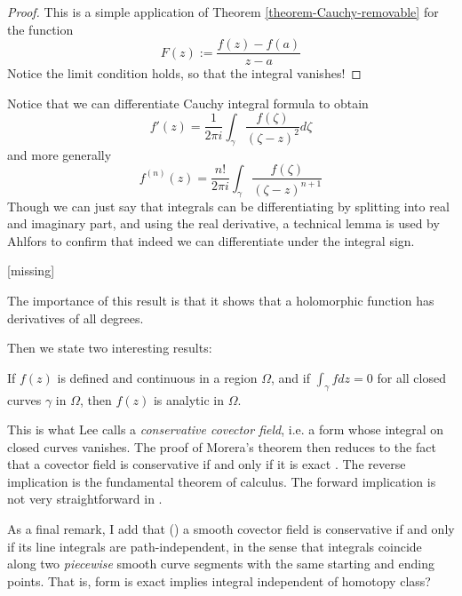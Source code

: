 \begin{proof}
This is a simple application of Theorem \ref{theorem-Cauchy-removable} for the
function
$$
F(z):=\frac{f(z)-f(a)}{z-a}
$$
Notice the limit condition holds, so that the integral vanishes!
\end{proof}

\noindent
Notice that we can differentiate Cauchy integral formula to obtain
\begin{equation}
\label{equation-first-derivative-Cauchy-formula}
f'(z)=\frac{1}{2\pi i}\int_\gamma\frac{f(\zeta)}{(\zeta-z)^2}d\zeta
\end{equation}
and more generally
$$
f^{(n)}(z)=\frac{n!}{2\pi i}\int_\gamma \frac{f(\zeta)}{(\zeta-z)^{n+1}}
$$
Though we can just say that integrals can be differentiating by splitting into
real and imaginary part, and using the real derivative, a technical lemma is 
used by Ahlfors to confirm that indeed we can differentiate
under the integral sign.

\begin{lemma}
\label{lemma-technical-lemma}
[missing]
\end{lemma}

\noindent
The importance of this result is that it shows that a holomorphic function has
derivatives of all degrees.

Then we state two interesting results:

\begin{theorem}[Morera]
\label{theorem-Morera}
\begin{reference}
\cite[p. 122]{ahl}
\end{reference}
If $f(z)$ is defined and continuous in a region $\Omega$, and if 
$\int_\gamma fdz=0$ for all closed curves $\gamma$ in $\Omega$, then $f(z)$ is
analytic in $\Omega$.
\end{theorem}

\noindent
This is what Lee calls a {\it conservative covector field}, i.e. a form whose
integral on closed curves vanishes. The proof of Morera's theorem then reduces
to the fact that a covector field is conservative if and only if it is exact
\cite[Theorem 11.42]{les}. The reverse implication is the fundamental theorem of
calculus. The forward implication is not very straightforward in \cite{les}.

As a final remark, I add that (\cite[Propoistion 11.40]{les}) a smooth covector
field is conservative if and only if its line integrals are path-independent, in
the sense that integrals coincide along two {\it piecewise} smooth curve
segments with the same starting and ending points. That is, form is exact
implies integral independent of homotopy class?

